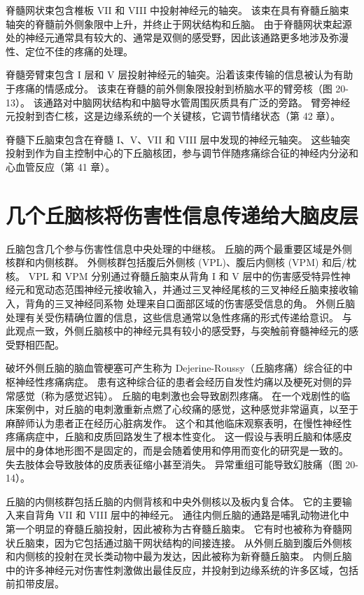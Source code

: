 脊髓网状束包含椎板 VII 和 VIII 中投射神经元的轴突。 该束在具有脊髓丘脑束轴突的脊髓前外侧象限中上升，并终止于网状结构和丘脑。 由于脊髓网状束起源处的神经元通常具有较大的、通常是双侧的感受野，因此该通路更多地涉及弥漫性、定位不佳的疼痛的处理。

脊髓旁臂束包含 I 层和 V 层投射神经元的轴突。沿着该束传输的信息被认为有助于疼痛的情感成分。 该束在脊髓的前外侧象限投射到桥脑水平的臂旁核（图 20-13）。 该通路对中脑网状结构和中脑导水管周围灰质具有广泛的旁路。 臂旁神经元投射到杏仁核，这是边缘系统的一个关键核，它调节情绪状态（第 42 章）。

脊髓下丘脑束包含在脊髓 I、V、VII 和 VIII 层中发现的神经元轴突。 这些轴突投射到作为自主控制中心的下丘脑核团，参与调节伴随疼痛综合征的神经内分泌和心血管反应（第 41 章）。


\section{几个丘脑核将伤害性信息传递给大脑皮层}
丘脑包含几个参与伤害性信息中央处理的中继核。 丘脑的两个最重要区域是外侧核群和内侧核群。 外侧核群包括腹后外侧核 (VPL)、腹后内侧核 (VPM) 和后/枕核。 VPL 和 VPM 分别通过脊髓丘脑束从背角 I 和 V 层中的伤害感受特异性神经元和宽动态范围神经元接收输入，并通过三叉神经尾核的三叉神经丘脑束接收输入，背角的三叉神经同系物 处理来自口面部区域的伤害感受信息的角。 外侧丘脑处理有关受伤精确位置的信息，这些信息通常以急性疼痛的形式传递给意识。 与此观点一致，外侧丘脑核中的神经元具有较小的感受野，与突触前脊髓神经元的感受野相匹配。

破坏外侧丘脑的脑血管梗塞可产生称为 Dejerine-Roussy（丘脑疼痛）综合征的中枢神经性疼痛病症。 患有这种综合征的患者会经历自发性灼痛以及梗死对侧的异常感觉（称为感觉迟钝）。 丘脑的电刺激也会导致剧烈疼痛。 在一个戏剧性的临床案例中，对丘脑的电刺激重新点燃了心绞痛的感觉，这种感觉非常逼真，以至于麻醉师认为患者正在经历心脏病发作。 这个和其他临床观察表明，在慢性神经性疼痛病症中，丘脑和皮质回路发生了根本性变化。 这一假设与表明丘脑和体感皮层中的身体地形图不是固定的，而是会随着使用和停用而变化的研究是一致的。 失去肢体会导致肢体的皮质表征缩小甚至消失。 异常重组可能导致幻肢痛（图 20-14）。

丘脑的内侧核群包括丘脑的内侧背核和中央外侧核以及板内复合体。 它的主要输入来自背角 VII 和 VIII 层中的神经元。 通往内侧丘脑的通路是哺乳动物进化中第一个明显的脊髓丘脑投射，因此被称为古脊髓丘脑束。 它有时也被称为脊髓网状丘脑束，因为它包括通过脑干网状结构的间接连接。 从外侧丘脑到腹后外侧核和内侧核的投射在灵长类动物中最为发达，因此被称为新脊髓丘脑束。 内侧丘脑中的许多神经元对伤害性刺激做出最佳反应，并投射到边缘系统的许多区域，包括前扣带皮层。


